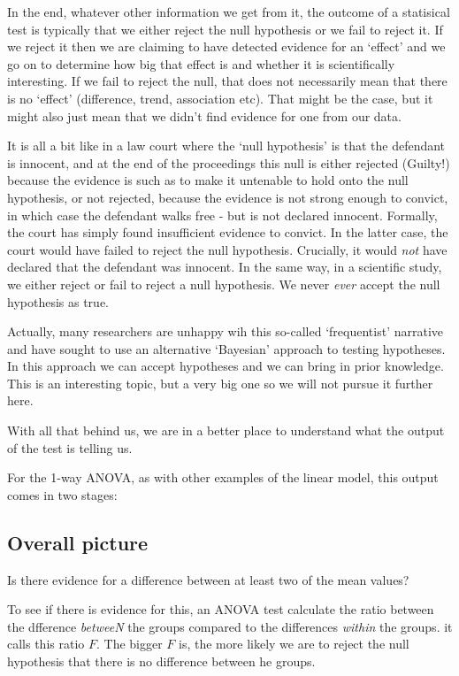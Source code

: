 \documentclass[
  letterpaper,
  DIV=11,
  numbers=noendperiod]{scrreprt}
\begin{document}
In the end, whatever other information we get from it, the outcome of a
statisical test is typically that we either reject the null hypothesis
or we fail to reject it. If we reject it then we are claiming to have
detected evidence for an `effect' and we go on to determine how big that
effect is and whether it is scientifically interesting. If we fail to
reject the null, that does not necessarily mean that there is no
`effect' (difference, trend, association etc). That might be the case,
but it might also just mean that we didn't find evidence for one from
our data.

It is all a bit like in a law court where the `null hypothesis' is that
the defendant is innocent, and at the end of the proceedings this null
is either rejected (Guilty!) because the evidence is such as to make it
untenable to hold onto the null hypothesis, or not rejected, because the
evidence is not strong enough to convict, in which case the defendant
walks free - but is not declared innocent. Formally, the court has
simply found insufficient evidence to convict. In the latter case, the
court would have failed to reject the null hypothesis. Crucially, it
would \emph{not} have declared that the defendant was innocent. In the
same way, in a scientific study, we either reject or fail to reject a
null hypothesis. We never \emph{ever} accept the null hypothesis as
true.

Actually, many researchers are unhappy wih this so-called `frequentist'
narrative and have sought to use an alternative `Bayesian' approach to
testing hypotheses. In this approach we can accept hypotheses and we can
bring in prior knowledge. This is an interesting topic, but a very big
one so we will not pursue it further here.

With all that behind us, we are in a better place to understand what the
output of the test is telling us.

For the 1-way ANOVA, as with other examples of the linear model, this
output comes in two stages:

\subsection{Overall picture}\label{overall-picture}

Is there evidence for a difference between at least two of the mean
values?

To see if there is evidence for this, an ANOVA test calculate the ratio
between the dfference \emph{betweeN} the groups compared to the
differences \emph{within} the groups. it calls this ratio \(F\). The
bigger \(F\) is, the more likely we are to reject the null hypothesis
that there is no difference between he groups.
\end{document}
